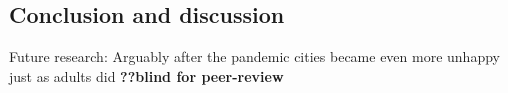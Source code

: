 \documentclass[10pt, letterpaper]{article}
\begin{document}
\begin{spacing}{1.4}
\section{Conclusion and discussion}

Future research:
Arguably after the pandemic cities became even more unhappy just as adults did
\textbf{??blind for peer-review}

                                                       


    



\end{spacing}
\end{document}

